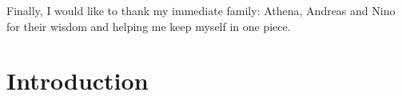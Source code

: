 \documentclass[12pt,twoside]{report}
\makeatletter
\numberwithin{equation}{section}
\newcommand{\chapterauthor}[1]{%
  {\parindent0pt\vspace*{-25pt}%
  \linespread{1.1}\large\scshape#1%
  \par\nobreak\vspace*{35pt}}
  \@afterheading%
}
\makeatother
\begin{document}
Finally, I would like to thank my immediate family: Athena, Andreas and Nino for their wisdom and helping me keep myself in one piece.
\chapter{Introduction}

%
% 

% 

% 

\end{document}
